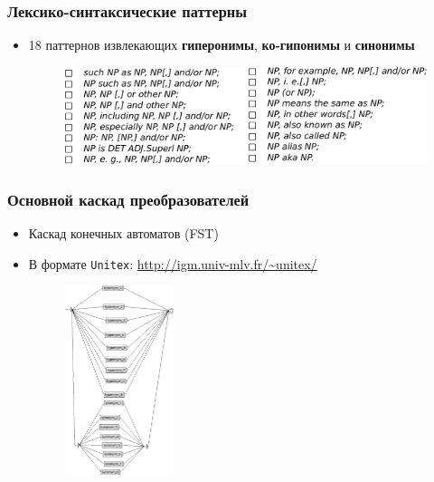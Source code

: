 \begin{frame}
\frametitle{Лексико-синтаксические паттерны}

\begin{itemize}
  \item 18 паттернов извлекающих \textbf{гиперонимы},
  \textbf{ко-гипонимы} и \textbf{синонимы}
\begin{figure}  
    \centering
        \includegraphics[width=1.0\textwidth]{figures/patterns}
    \end{figure}
\end{itemize}

\end{frame}

\begin{frame}
\frametitle{Основной каскад преобразователей}

\begin{itemize}
  \item Каскад конечных автоматов (FST)
  \item В формате \texttt{Unitex}: \url{http://igm.univ-mlv.fr/~unitex/}
  
\begin{figure}  
    \centering
        \includegraphics[width=0.3\textwidth]{figures/main-graph}
    \end{figure}
\end{itemize}

\end{frame}

